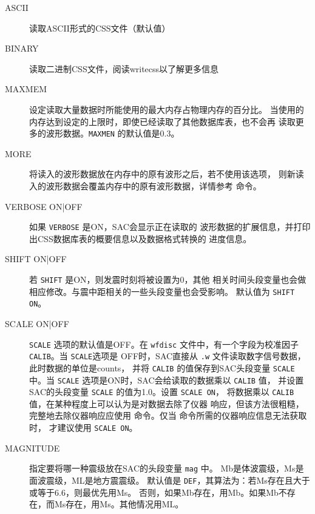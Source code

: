 \begin{description}
\item [ASCII] 读取ASCII形式的CSS文件（默认值）
\item [BINARY] 读取二进制CSS文件，阅读writecss以了解更多信息
\item [MAXMEM] 设定读取大量数据时所能使用的最大内存占物理内存的百分比。
    当使用的内存达到设定的上限时，即使已经读取了其他数据库表，也不会再
    读取更多的波形数据。\texttt{MAXMEN} 的默认值是0.3。
\item [MORE] 将读入的波形数据放在内存中的原有波形之后，若不使用该选项，
    则新读入的波形数据会覆盖内存中的原有波形数据，详情参考 
    命令。
\item [VERBOSE ON|OFF] 如果 \texttt{VERBOSE} 是ON，SAC会显示正在读取的
    波形数据的扩展信息，并打印出CSS数据库表的概要信息以及数据格式转换的
    进度信息。
\item [SHIFT ON|OFF] 若 \texttt{SHIFT} 是ON，则发震时刻将被设置为0，其他
    相关时间头段变量也会做相应修改。与震中距相关的一些头段变量也会受影响。
    默认值为 \texttt{SHIFT ON}。
\item [SCALE ON|OFF] \texttt{SCALE} 选项的默认值是OFF。在 \texttt{wfdisc}
    文件中，有一个字段为校准因子 \texttt{CALIB}。当 \texttt{SCALE}选项是
    OFF时，SAC直接从 \texttt{.w} 文件读取数字信号数据，此时数据的单位是counts，
    并将 \texttt{CALIB} 的值保存到SAC头段变量 \texttt{SCALE} 中。当
    \texttt{SCALE} 选项是ON时，SAC会给读取的数据乘以 \texttt{CALIB} 值，
    并设置SAC的头段变量 \texttt{SCALE} 的值为1.0。设置 \texttt{SCALE ON}，
    将数据乘以 \texttt{CALIB} 值，在某种程度上可以认为是对数据去除了仪器
    响应，但该方法很粗糙，完整地去除仪器响应应使用 
    命令。仅当  命令所需的仪器响应信息无法获取时，
    才建议使用 \texttt{SCALE ON}。
\item [MAGNITUDE] 指定要将哪一种震级放在SAC的头段变量 \texttt{mag} 中。
    Mb是体波震级，Ms是面波震级，ML是地方震震级。
    默认值是 \texttt{DEF}，其算法为：若Ms存在且大于或等于6.6，则最优先用Ms。
    否则，如果Mb存在，用Mb。如果Mb不存在，而Ms存在，用Ms。其他情况用ML。

\end{description}
